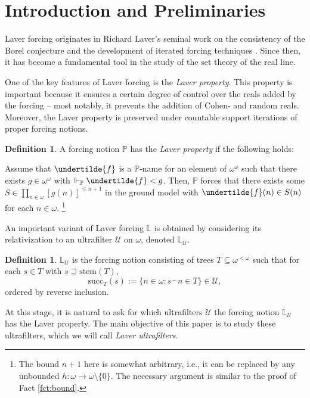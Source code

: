 \documentclass[12pt]{article}
\theoremstyle{definition}
\newtheorem{defi}[nummer]{\sc Definition}
\begin{document}

\setcounter{section}{0}
\section{Introduction and Preliminaries}

Laver forcing originates in Richard Laver’s seminal work on the consistency of the Borel conjecture and the development of iterated forcing techniques \cite{laver}. Since then, it has become a fundamental tool in the study of the set theory of the real line.

One of the key features of Laver forcing is the \emph{Laver property}. This property is important because it ensures a certain degree of control over the reals added by the forcing -- most notably, it prevents the addition of Cohen- and random reals. Moreover, the Laver property is preserved under countable support iterations of proper forcing notions.

\begin{defi}
A forcing notion $\mathbb{P}$ has the \textit{Laver property} if the following holds:

Assume that $\undertilde{f}$ is a $\mathbb{P}$-name for an element of $\omega^\omega$ such that there exists $g \in \omega^\omega$ with $\Vdash_{\mathbb{P}}\undertilde{f}<g$. Then, $\mathbb{P}$ forces that there exists some $S \in \prod_{n \in \omega} [g(n)]^{\leq n+1} $ in the ground model with $\undertilde{f}(n)\in S(n)$ for each $n\in \omega$. \footnote{The bound $n+1$ here is somewhat arbitrary, i.e., it can be replaced by any unbounded $h: \omega \to \omega \setminus \{0\}$. The necessary argument is similar to the proof of Fact \ref{fct:bound}.}
\end{defi}

An important variant of Laver forcing $\mathbb{L}$ is obtained by considering its relativization to an ultrafilter $\mathcal{U}$ on $\omega$, denoted $\mathbb{L}_{\mathcal{U}}$.

\begin{defi}
$\mathbb{L}_{\mathcal{U}}$ is the forcing notion consisting of trees $T \subseteq \omega^{<\omega}$ such that for each $s \in T$ with $s \supseteq \text{stem}(T)$,
\[\text{succ}_T(s):=\{n \in \omega: s^{\smallfrown}n \in T\}\in \mathcal{U},\] ordered by reverse inclusion.
\end{defi}

At this stage, it is natural to ask for which ultrafilters $\mathcal{U}$ the forcing notion $\mathbb{L}_{\mathcal{U}}$ has the Laver property. The main objective of this paper is to study these ultrafilters, which we will call \emph{Laver ultrafilters}.
\end{document}
